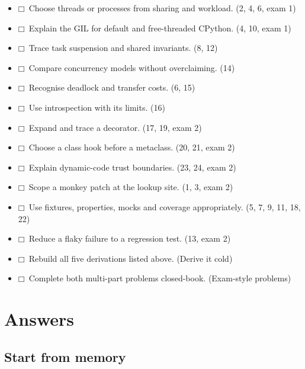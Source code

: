 \documentclass[11pt]{article}
\begin{document}
\begin{keepsection}
\begin{keepsection}
\begin{itemize}
\item $\mdlgwhtsquare$\ Choose threads or processes from sharing and workload. (2, 4, 6, exam 1)
\item $\mdlgwhtsquare$\ Explain the GIL for default and free-threaded CPython. (4, 10, exam 1)
\item $\mdlgwhtsquare$\ Trace task suspension and shared invariants. (8, 12)
\item $\mdlgwhtsquare$\ Compare concurrency models without overclaiming. (14)
\item $\mdlgwhtsquare$\ Recognise deadlock and transfer costs. (6, 15)
\item $\mdlgwhtsquare$\ Use introspection with its limits. (16)
\item $\mdlgwhtsquare$\ Expand and trace a decorator. (17, 19, exam 2)
\item $\mdlgwhtsquare$\ Choose a class hook before a metaclass. (20, 21, exam 2)
\item $\mdlgwhtsquare$\ Explain dynamic-code trust boundaries. (23, 24, exam 2)
\item $\mdlgwhtsquare$\ Scope a monkey patch at the lookup site. (1, 3, exam 2)
\item $\mdlgwhtsquare$\ Use fixtures, properties, mocks and coverage appropriately. (5, 7, 9, 11, 18, 22)
\item $\mdlgwhtsquare$\ Reduce a flaky failure to a regression test. (13, exam 2)
\item $\mdlgwhtsquare$\ Rebuild all five derivations listed above. (Derive it cold)
\item $\mdlgwhtsquare$\ Complete both multi-part problems closed-book. (Exam-style problems)
\end{itemize}
\end{keepsection}


\clearpage
\section{Answers}
\begin{keepsection}\subsection{Start from memory}


\end{keepsection}
\end{keepsection}
\end{document}
